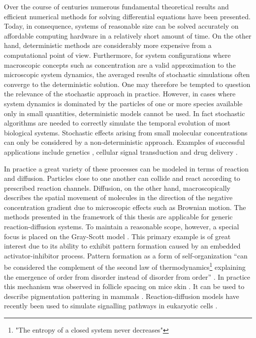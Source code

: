 {Over the course of centuries numerous fundamental theoretical results and efficient numerical methods for solving differential equations have been presented. Today, in consequence, systems of reasonable size can be solved accurately on affordable computing hardware in a relatively short amount of time. On the other hand, deterministic methods are considerably more expensive from a computational point of view. Furthermore, for system configurations where macroscopic concepts such as concentration are a valid approximation to the microscopic system dynamics, the averaged results of stochastic simulations often converge to the deterministic solution. One may therefore be tempted to question the relevance of the stochastic approach in practice. However, in cases where system dynamics is dominated by the particles of one or more species available only in small quantities, deterministic models cannot be used. In fact stochastic algorithms are needed to correctly simulate the temporal evolution of most biological systems. Stochastic effects arising from small molecular concentrations can only be considered by a non-deterministic approach. Examples of successful applications include genetics \cite{mcadams_stochastic_1997}, cellular signal transduction \cite{erban_signal_2005} and drug delivery \cite{ford_multi-scale_2011}. 

In practice a great variety of these processes can be modeled in terms of reaction and diffusion. Particles close to one another can collide and react according to prescribed reaction channels. Diffusion, on the other hand, macroscopically describes the spatial movement of molecules in the direction of the negative concentration gradient due to microscopic effects such as Brownian motion. The methods presented in the framework of this thesis are applicable for generic reaction-diffusion systems. To maintain a reasonable scope, however, a special focus is placed on the Gray-Scott model \cite{gray_autocatalytic_1984, pearson_complex_1993}. This primary example is of great interest due to its ability to exhibit pattern formation caused by an embedded activator-inhibitor process. Pattern formation as a form of self-organization ``can be considered the complement of the second law of thermodynamics\footnote{"The entropy of a closed system never decreases"} explaining the emergence of order from disorder instead of disorder from order'' \cite{mainzer_local_2013}. In practice this mechanism was observed in follicle spacing on mice skin \cite{sick_wnt_2006}. It can be used to describe pigmentation pattering in mammals \cite{murray_mathematical_2002}. Reaction-diffusion models have recently been used to simulate signalling pathways in eukaryotic cells \cite{takahashi_spatio-temporal_2010}. 

}
